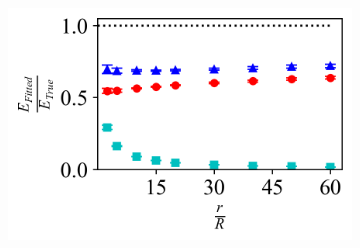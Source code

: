 \begin{figure}[H]
\begin{subfigure}[t]{0.32\textwidth}
        \includegraphics[width=1\linewidth]{Figures/Capped-Sphere-Youngs_Modulus.png}
    \end{subfigure}

    \hfill
    \vspace{-0.4in}
    

\end{figure}
